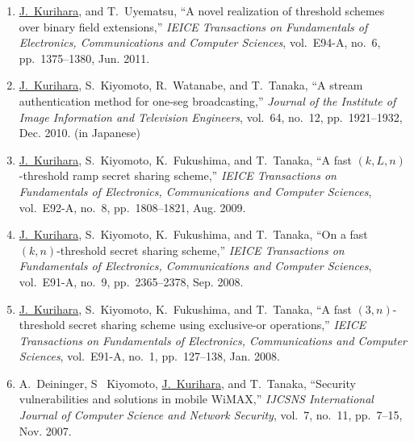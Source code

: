 \begin{enumerate}
 \item \underline{J.~Kurihara}, and T.~Uyematsu, ``A novel realization
       of threshold schemes over binary field extensions,''
       \textit{IEICE Transactions on Fundamentals of Electronics, Communications and Computer Sciences},
       vol.~E94-A, no.~6, pp.~1375--1380, Jun. 2011.
 \item \underline{J.~Kurihara}, S.~Kiyomoto, R.~Watanabe, and
       T.~Tanaka, ``A stream authentication method for one-seg
       broadcasting,'' \textit{Journal of the Institute of Image
       Information and Television Engineers},
       vol.~64, no.~12, pp.~1921--1932, Dec. 2010. (in Japanese)
 \item \underline{J.~Kurihara}, S.~Kiyomoto, K.~Fukushima, and
       T.~Tanaka, ``A fast $(k,L,n)$-threshold ramp secret sharing
       scheme,'' \textit{IEICE Transactions on Fundamentals of Electronics, Communications and Computer Sciences},
       vol.~E92-A, no.~8, pp.~1808--1821, Aug. 2009.
 \item \underline{J.~Kurihara}, S.~Kiyomoto, K.~Fukushima, and
       T.~Tanaka, ``On a fast $(k,n)$-threshold secret sharing scheme,''
       \textit{IEICE Transactions on Fundamentals of Electronics, Communications and Computer Sciences},
       vol.~E91-A, no.~9, pp.~2365--2378, Sep. 2008.
 \item \underline{J.~Kurihara}, S.~Kiyomoto, K.~Fukushima, and
       T.~Tanaka, ``A fast $(3,n)$-threshold secret sharing scheme using
       exclusive-or operations,''
       \textit{IEICE Transactions on Fundamentals of Electronics, Communications and Computer Sciences},
       vol.~E91-A, no.~1, pp.~127--138, Jan. 2008.
 \item A.~Deininger, S~ Kiyomoto, \underline{J.~Kurihara}, and
       T.~Tanaka, ``Security vulnerabilities and solutions in mobile
       WiMAX,'' \textit{IJCSNS International Journal of Computer Science
       and Network Security}, vol.~7, no.~11, pp.~7--15, Nov. 2007.
\end{enumerate}
